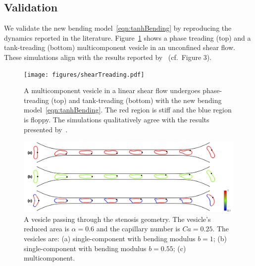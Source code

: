 \documentclass[twoside,twocolumn,9pt]{article}
\newcommand{\subfigimg}[3][,]{%
  \setbox1=\hbox{\texttt{[image: \#3]}}%
  \leavevmode\rlap{\usebox1}%
  \rlap{\hspace*{0pt}\raisebox{\dimexpr\ht1-0\baselineskip}{\bf
  \normalsize #2}}%
  \phantom{\usebox1}%
}
\begin{document}
\subsection{Validation}
\label{sec:validation}
We validate the new bending model~\eqref{eqn:tanhBending} by reproducing
the dynamics reported in the literature. Figure~\ref{fig:treading} shows
a phase treading (top) and a tank-treading (bottom) multicomponent
vesicle in an unconfined shear flow. These simulations align with the
results reported by~\citet{liu-mar-li-vee-low2017} (cf.~Figure 3).
\begin{figure}[h]
  \centering
  \texttt{[image: figures/shearTreading.pdf]}
  \caption{\label{fig:treading} \small A multicomponent vesicle in a
  linear shear flow undergoes phase-treading (top) and tank-treading
  (bottom) with the new bending model~\eqref{eqn:tanhBending}. The red
  region is stiff and the blue region is floppy. The simulations
  qualitatively agree with the results presented
  by~\citet{liu-mar-li-vee-low2017}.}
\end{figure}


\begin{figure}[h]
  \centering
  \includegraphics[width=0.9\linewidth]{figures/STENOSIS_RAp6MCp5.pdf}
  \caption{\label{fig:RA6} \small A vesicle passing through the stenosis
  geometry. The vesicle's reduced area is $\alpha = 0.6$ and the
  capillary number is $Ca = 0.25$. The vesicles are: (a)
  single-component with bending modulus $b=1$; (b) single-component with
  bending modulus $b=0.55$; (c) multicomponent.}
\end{figure}
\end{document}
